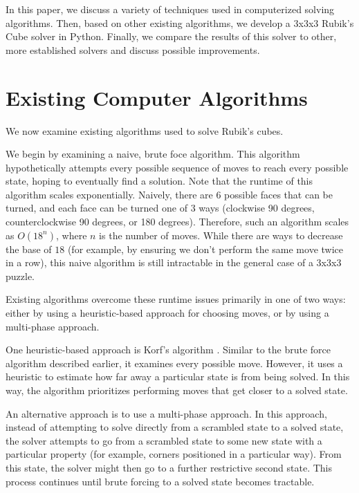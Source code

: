 \documentclass{article}
\begin{document}
In this paper, we discuss a variety of techniques used in computerized solving algorithms. Then, based on other existing algorithms, we develop a 3x3x3 Rubik's Cube solver in Python. Finally, we compare the results of this solver to other, more established solvers and discuss possible improvements.

\section{Existing Computer Algorithms}

We now examine existing algorithms used to solve Rubik's cubes.

We begin by examining a naive, brute foce algorithm. This algorithm hypothetically attempts every possible sequence of moves to reach every possible state, hoping to eventually find a solution. Note that the runtime of this algorithm scales exponentially. Naively, there are $6$ possible faces that can be turned, and each face can be turned one of $3$ ways (clockwise 90 degrees, counterclockwise 90 degrees, or 180 degrees). Therefore, such an algorithm scales as $O(18^n)$, where $n$ is the number of moves. While there are ways to decrease the base of $18$ (for example, by ensuring we don't perform the same move twice in a row), this naive algorithm is still intractable in the general case of a 3x3x3 puzzle.

Existing algorithms overcome these runtime issues primarily in one of two ways: either by using a heuristic-based approach for choosing moves, or by using a multi-phase approach.

One heuristic-based approach is Korf's algorithm \cite{korf}. Similar to the brute force algorithm described earlier, it examines every possible move. However, it uses a heuristic to estimate how far away a particular state is from being solved. In this way, the algorithm prioritizes performing moves that get closer to a solved state. 

An alternative approach is to use a multi-phase approach. In this approach, instead of attempting to solve directly from a scrambled state to a solved state, the solver attempts to go from a scrambled state to some new state with a particular property (for example, corners positioned in a particular way). From this state, the solver might then go to a further restrictive second state. This process continues until brute forcing to a solved state becomes tractable.
\end{document}

